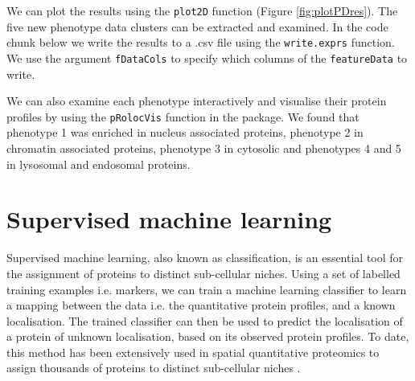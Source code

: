 We can plot the results using the \texttt{plot2D} function (Figure
\ref{fig:plotPDres}). The five new phenotype data clusters can be
extracted and examined.  In the code chunk below we write the results
to a .csv file using the \texttt{write.exprs} function. We use the
argument \texttt{fDataCols} to specify which columns of the
\texttt{featureData} to write.

\begin{knitrout}
\color{fgcolor}\begin{kframe}
\begin{alltt}
\hlopt{$} \hlkwb{<-} \hlstd{(}\hlopt{$}
  \hlstd{=} \hlstd{,}  \hlstd{=} \hlstd{,}  \hlstd{=} \hlstd{)}
\end{alltt}
\end{kframe}
\end{knitrout}

We can also examine each phenotype interactively and visualise
their protein profiles by using the \texttt{pRolocVis} function in the
 package. We found that phenotype 1 was
enriched in nucleus associated proteins, phenotype 2 in chromatin
associated proteins, phenotype 3 in cytosolic and phenotypes 4 and 5
in lysosomal and endosomal proteins.


\section*{Supervised machine learning}

Supervised machine learning, also known as classification, is an
essential tool for the assignment of proteins to distinct sub-cellular
niches. Using a set of labelled training examples i.e. markers, we can
train a machine learning classifier to learn a mapping between the
data i.e. the quantitative protein profiles, and a known localisation.
The trained classifier can then be used to predict the localisation of
a protein of unknown localisation, based on its observed protein
profiles. To date, this method has been extensively used in spatial
quantitative proteomics to assign thousands of proteins to distinct
sub-cellular niches
\cite{hyper,Groen:2014,Trotter:2010,Hall:2009,Dunkley:2006,Tan:2009}.

